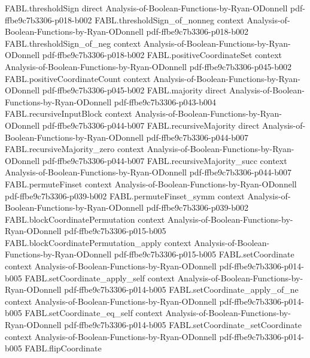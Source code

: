 \begin{theorem}
\proofstep
  {FABL.thresholdSign}
  {direct}
  {Analysis-of-Boolean-Functions-by-Ryan-ODonnell}
  {pdf-ffbe9c7b3306-p018-b002}
\proofstep
  {FABL.thresholdSign_of_nonneg}
  {context}
  {Analysis-of-Boolean-Functions-by-Ryan-ODonnell}
  {pdf-ffbe9c7b3306-p018-b002}
\proofstep
  {FABL.thresholdSign_of_neg}
  {context}
  {Analysis-of-Boolean-Functions-by-Ryan-ODonnell}
  {pdf-ffbe9c7b3306-p018-b002}
\proofstep
  {FABL.positiveCoordinateSet}
  {context}
  {Analysis-of-Boolean-Functions-by-Ryan-ODonnell}
  {pdf-ffbe9c7b3306-p045-b002}
\proofstep
  {FABL.positiveCoordinateCount}
  {context}
  {Analysis-of-Boolean-Functions-by-Ryan-ODonnell}
  {pdf-ffbe9c7b3306-p045-b002}
\proofstep
  {FABL.majority}
  {direct}
  {Analysis-of-Boolean-Functions-by-Ryan-ODonnell}
  {pdf-ffbe9c7b3306-p043-b004}
\proofstep
  {FABL.recursiveInputBlock}
  {context}
  {Analysis-of-Boolean-Functions-by-Ryan-ODonnell}
  {pdf-ffbe9c7b3306-p044-b007}
\proofstep
  {FABL.recursiveMajority}
  {direct}
  {Analysis-of-Boolean-Functions-by-Ryan-ODonnell}
  {pdf-ffbe9c7b3306-p044-b007}
\proofstep
  {FABL.recursiveMajority_zero}
  {context}
  {Analysis-of-Boolean-Functions-by-Ryan-ODonnell}
  {pdf-ffbe9c7b3306-p044-b007}
\proofstep
  {FABL.recursiveMajority_succ}
  {context}
  {Analysis-of-Boolean-Functions-by-Ryan-ODonnell}
  {pdf-ffbe9c7b3306-p044-b007}
\proofstep
  {FABL.permuteFinset}
  {context}
  {Analysis-of-Boolean-Functions-by-Ryan-ODonnell}
  {pdf-ffbe9c7b3306-p039-b002}
\proofstep
  {FABL.permuteFinset_symm}
  {context}
  {Analysis-of-Boolean-Functions-by-Ryan-ODonnell}
  {pdf-ffbe9c7b3306-p039-b002}
\proofstep
  {FABL.blockCoordinatePermutation}
  {context}
  {Analysis-of-Boolean-Functions-by-Ryan-ODonnell}
  {pdf-ffbe9c7b3306-p015-b005}
\proofstep
  {FABL.blockCoordinatePermutation_apply}
  {context}
  {Analysis-of-Boolean-Functions-by-Ryan-ODonnell}
  {pdf-ffbe9c7b3306-p015-b005}
\proofstep
  {FABL.setCoordinate}
  {context}
  {Analysis-of-Boolean-Functions-by-Ryan-ODonnell}
  {pdf-ffbe9c7b3306-p014-b005}
\proofstep
  {FABL.setCoordinate_apply_self}
  {context}
  {Analysis-of-Boolean-Functions-by-Ryan-ODonnell}
  {pdf-ffbe9c7b3306-p014-b005}
\proofstep
  {FABL.setCoordinate_apply_of_ne}
  {context}
  {Analysis-of-Boolean-Functions-by-Ryan-ODonnell}
  {pdf-ffbe9c7b3306-p014-b005}
\proofstep
  {FABL.setCoordinate_eq_self}
  {context}
  {Analysis-of-Boolean-Functions-by-Ryan-ODonnell}
  {pdf-ffbe9c7b3306-p014-b005}
\proofstep
  {FABL.setCoordinate_setCoordinate}
  {context}
  {Analysis-of-Boolean-Functions-by-Ryan-ODonnell}
  {pdf-ffbe9c7b3306-p014-b005}
\proofstep
  {FABL.flipCoordinate}

\end{theorem}
